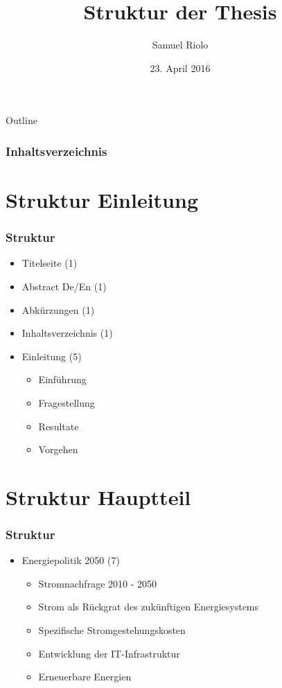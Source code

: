 \documentclass{beamer}
\title[Energie in der Informatik]{Struktur der Thesis}
\author{Samuel Riolo}
\institute{FFHS}
\date{23. April 2016}
\begin{document}
\begin{frame}
  \titlepage
\end{frame}

\begin{frame}{Outline}
\frametitle{Inhaltsverzeichnis}
    \tableofcontents[]
\end{frame}

\section{Struktur Einleitung} 
\begin{frame}
\frametitle{Struktur} 
\begin{itemize}
\item Titelseite                                      (1)
\item Abstract De/En                                  (1)
\item Abkürzungen                                     (1)
\item Inhaltsverzeichnis                              (1)

\item Einleitung                                      (5)
 \begin{itemize}
 \item Einführung
 \item Fragestellung
 \item Resultate
 \item Vorgehen     
 \end{itemize}
\end{itemize}

\end{frame}


\section{Struktur Hauptteil}
\begin{frame}
\frametitle{Struktur} 
\begin{itemize}
\item Energiepolitik 2050                             (7)
\begin{itemize}
 \item Stromnachfrage 2010 - 2050
 \item Strom als Rückgrat des zukünftigen Energiesystems
 \item Spezifische Stromgestehungskosten
 \item Entwicklung der IT-Infrastruktur
 \item Erneuerbare Energien
\end{itemize}
\end{itemize}

\end{frame}
\end{document}
